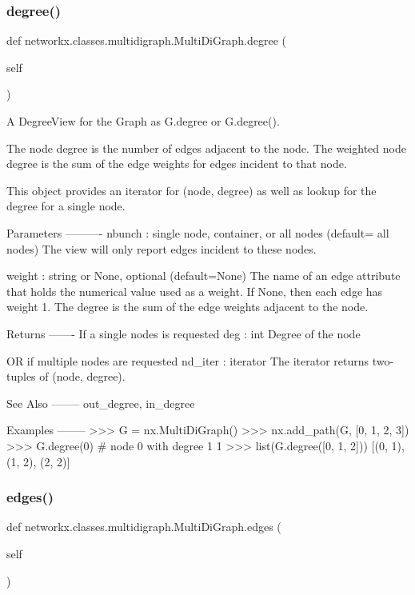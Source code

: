 \subsubsection{\texorpdfstring{degree()}{degree()}}
{\footnotesize\ttfamily def networkx.\+classes.\+multidigraph.\+Multi\+Di\+Graph.\+degree (\begin{DoxyParamCaption}\item[{}]{self }\end{DoxyParamCaption})}

\begin{DoxyVerb}A DegreeView for the Graph as G.degree or G.degree().

The node degree is the number of edges adjacent to the node.
The weighted node degree is the sum of the edge weights for
edges incident to that node.

This object provides an iterator for (node, degree) as well as
lookup for the degree for a single node.

Parameters
----------
nbunch : single node, container, or all nodes (default= all nodes)
    The view will only report edges incident to these nodes.

weight : string or None, optional (default=None)
   The name of an edge attribute that holds the numerical value used
   as a weight.  If None, then each edge has weight 1.
   The degree is the sum of the edge weights adjacent to the node.

Returns
-------
If a single nodes is requested
deg : int
    Degree of the node

OR if multiple nodes are requested
nd_iter : iterator
    The iterator returns two-tuples of (node, degree).

See Also
--------
out_degree, in_degree

Examples
--------
>>> G = nx.MultiDiGraph()
>>> nx.add_path(G, [0, 1, 2, 3])
>>> G.degree(0)  # node 0 with degree 1
1
>>> list(G.degree([0, 1, 2]))
[(0, 1), (1, 2), (2, 2)]\end{DoxyVerb}
 \mbox{\label{classnetworkx_1_1classes_1_1multidigraph_1_1MultiDiGraph_a116c40637e7a1835a9f1642fdee198ce}} 
\subsubsection{\texorpdfstring{edges()}{edges()}}
{\footnotesize\ttfamily def networkx.\+classes.\+multidigraph.\+Multi\+Di\+Graph.\+edges (\begin{DoxyParamCaption}\item[{}]{self }\end{DoxyParamCaption})}

